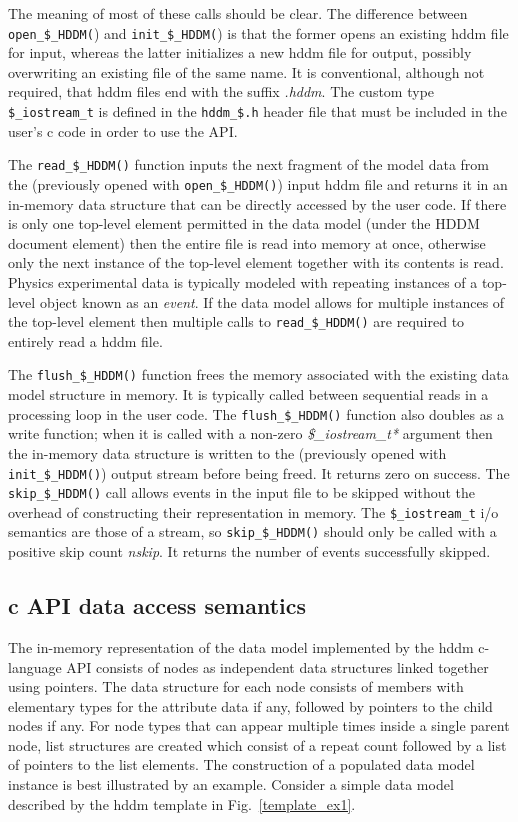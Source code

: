 \documentclass{revtex4}
\begin{document}
The meaning of most of these calls should be clear.  The difference between
\texttt{open\_\$\_HDDM(}) and \texttt{init\_\$\_HDDM(}) is that the former opens an
existing hddm file for input, whereas the latter initializes a new hddm file
for output, possibly overwriting an existing file of the same name.  It is
conventional, although not required, that hddm files end with the suffix
{\em .hddm}.  The custom type \texttt{\$\_iostream\_t} is defined in the
\texttt{hddm\_\$.h} header file that must be included in the user's c code in
order to use the API.

The \texttt{read\_\$\_HDDM()} function inputs the next fragment of the model data
from the (previously opened with \texttt{open\_\$\_HDDM()}) input hddm file and
returns it in an in-memory data structure that can be directly accessed by
the user code.  If there is only one top-level element permitted in the data
model (under the HDDM document element) then the entire file is read into
memory at once, otherwise only the next instance of the top-level element
together with its contents is read. Physics experimental data is typically
modeled with repeating instances of a top-level object known as an {\em event}.
If the data model allows for multiple instances of the top-level element then
multiple calls to \texttt{read\_\$\_HDDM()} are required to entirely read a hddm
file.  

The \texttt{flush\_\$\_HDDM()} function frees the memory associated with the
existing data model structure in memory.  It is typically called between
sequential reads in a processing loop in the user code.  The
\texttt{flush\_\$\_HDDM()} function also doubles as a write function; when it is
called with a non-zero {\em \$\_iostream\_t*} argument then the in-memory data
structure is written to the (previously opened with \texttt{init\_\$\_HDDM()})
output stream before being freed. It returns zero on success. The 
\texttt{skip\_\$\_HDDM()} call allows events in the input file to be skipped
without the overhead of constructing their representation in memory.
The \texttt{\$\_iostream\_t} i/o semantics are those of a stream, so 
\texttt{skip\_\$\_HDDM()} should only be called with a positive skip count 
{\em nskip}.  It returns the number of events successfully skipped.

\subsection{c API data access semantics}

The in-memory representation of the data model implemented by the
hddm c-language API consists of nodes as independent data structures linked
together using pointers.  The data structure for each node consists of
members with elementary types for the attribute data if any, followed by
pointers to the child nodes if any.  For node types that can appear
multiple times inside a single parent node, list structures are created
which consist of a repeat count followed by a list of pointers to the
list elements.  The construction of a populated data model instance is
best illustrated by an example.  Consider a simple data model described
by the hddm template in Fig.~\ref{template_ex1}.
\end{document}
